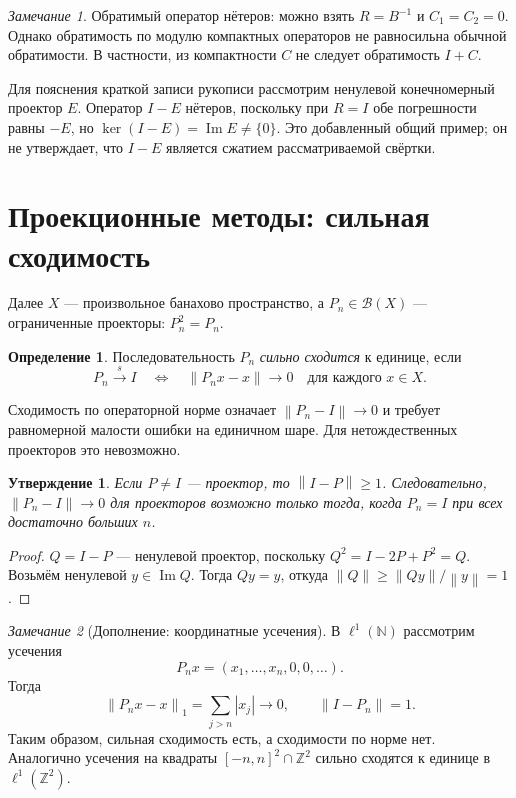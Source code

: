 \documentclass[12pt,a4paper]{article}
\newtheorem{proposition}{Утверждение}
\theoremstyle{definition}
\newtheorem{definition}{Определение}
\theoremstyle{remark}
\newtheorem*{remark}{Замечание}
\newcommand{\ZZ}{\mathbb{Z}}
\newcommand{\norm}[1]{\left\lVert #1\right\rVert}
\newcommand{\BB}{\mathcal B}
\begin{document}
\begin{remark}
Обратимый оператор нётеров: можно взять $R=B^{-1}$ и $C_1=C_2=0$.
Однако обратимость по модулю компактных операторов не равносильна
обычной обратимости. В частности, из компактности $C$ не следует
обратимость $I+C$.

Для пояснения краткой записи рукописи рассмотрим ненулевой
конечномерный проектор $E$. Оператор $I-E$ нётеров, поскольку
при $R=I$ обе погрешности равны $-E$, но
$\ker(I-E)=\operatorname{Im}E\ne\{0\}$.
Это добавленный общий пример; он не утверждает, что $I-E$
является сжатием рассматриваемой свёртки.
\end{remark}

\section{Проекционные методы: сильная сходимость}

Далее $X$ --- произвольное банахово пространство, а
$P_n\in\BB(X)$ --- ограниченные проекторы: $P_n^2=P_n$.

\begin{definition}
Последовательность $P_n$ \emph{сильно сходится} к единице, если
\[
  P_n\xrightarrow{s}I
  \quad\Longleftrightarrow\quad
  \norm{P_nx-x}\longrightarrow0\quad\text{для каждого }x\in X.
\]
\end{definition}

Сходимость по операторной норме означает
$\norm{P_n-I}\to0$ и требует равномерной малости ошибки на
единичном шаре. Для нетождественных проекторов это невозможно.

\begin{proposition}
Если $P\ne I$ --- проектор, то $\norm{I-P}\geqslant1$.
Следовательно, $\norm{P_n-I}\to0$ для проекторов возможно
только тогда, когда $P_n=I$ при всех достаточно больших $n$.
\end{proposition}

\begin{proof}
$Q=I-P$ --- ненулевой проектор, поскольку $Q^2=I-2P+P^2=Q$.
Возьмём ненулевой $y\in\operatorname{Im}Q$. Тогда $Qy=y$, откуда
$\norm{Q}\geqslant\norm{Qy}/\norm{y}=1$.
\end{proof}

\begin{remark}[Дополнение: координатные усечения]
В $\ell^1(\mathbb N)$ рассмотрим усечения
\[
  P_nx=(x_1,\ldots,x_n,0,0,\ldots).
\]
Тогда
\[
  \norm{P_nx-x}_1=\sum_{j>n}|x_j|\longrightarrow0,
  \qquad \norm{I-P_n}=1.
\]
Таким образом, сильная сходимость есть, а сходимости по норме нет.
Аналогично усечения на квадраты $[-n,n]^2\cap\ZZ^2$
сильно сходятся к единице в $\ell^1(\ZZ^2)$.
\end{remark}
\end{document}
